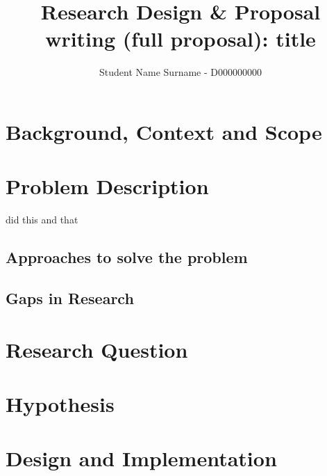 \documentclass[	DIV=calc,%
							paper=a4,%
							fontsize=11pt,%
							twocolumn]{scrartcl}	 				%
\title{Research Design \& Proposal writing (full proposal): title}					%
\author{Student Name Surname - D000000000 }
\date{}																				%
\begin{document}
\maketitle
\thispagestyle{fancy} 			%

\section{Background, Context and Scope}

\section{Problem Description}
\cite{Goodfellow2014} did this and that

\subsection{Approaches to solve the problem}
\subsection{Gaps in Research}
\section{Research Question}


\section{Hypothesis}
\section{Design and Implementation}

\end{document}
